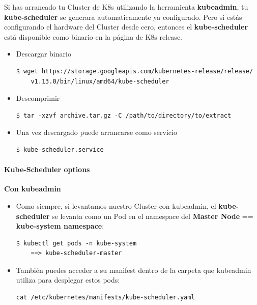 \documentclass{article}
\newenvironment{codetemplate}[1][]{%
  \mybasecolorbox[#1]
  \itshape
}{%
  \endmybasecolorbox
}
\begin{document}
Si has arrancado tu Cluster de K8s utilizando la herramienta \textbf{kubeadmin}, tu \textbf{kube-scheduler} se generara automaticamente ya configurado. Pero si estás configurando el hardware del Cluster desde cero, entonces el \textbf{kube-scheduler} está disponible como binario en la página de K8s release.

\begin{itemize}
    \item Descargar binario
\begin{codetemplate}{}
\begin{verbatim}
$ wget https://storage.googleapis.com/kubernetes-release/release/
    v1.13.0/bin/linux/amd64/kube-scheduler
\end{verbatim}
\end{codetemplate}

    \item Descomprimir
\begin{codetemplate}{}
\begin{verbatim}
$ tar -xzvf archive.tar.gz -C /path/to/directory/to/extract
\end{verbatim}
\end{codetemplate} 

    \item Una vez descargado puede arrancarse como servicio
\begin{codetemplate}{}
\begin{verbatim}
$ kube-scheduler.service
\end{verbatim}
\end{codetemplate}
\end{itemize}

\paragraph{Kube-Scheduler options}

\textbf{Con kubeadmin}

\begin{itemize}
    \item Como siempre, si levantamos nuestro Cluster con kubeadmin, el \textbf{kube-scheduler} se levanta como un Pod en el namespace del \textbf{Master Node} == \textbf{kube-system namespace}:
\begin{codetemplate}{}
\begin{verbatim}
$ kubectl get pods -n kube-system
    ==> kube-scheduler-master
\end{verbatim}
\end{codetemplate}

    \item También puedes acceder a su manifest dentro de la carpeta que kubeadmin utiliza para desplegar estos pods:
\begin{codetemplate}{}
\begin{verbatim}
cat /etc/kubernetes/manifests/kube-scheduler.yaml
\end{verbatim}
\end{codetemplate}
\end{itemize}
\end{document}
